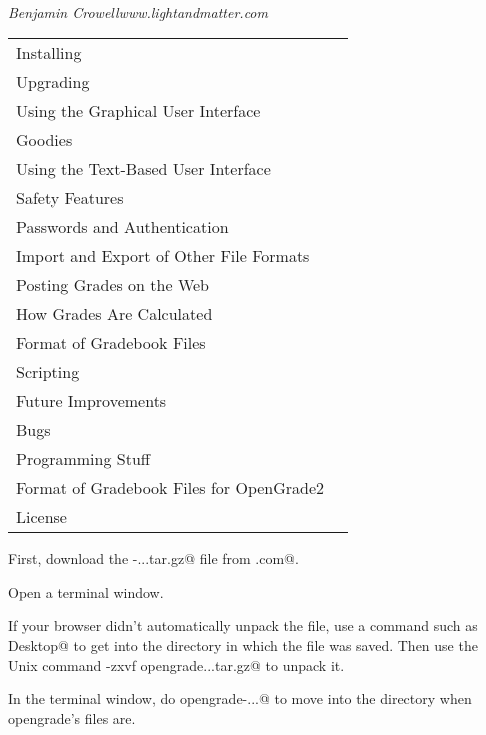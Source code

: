 \documentclass{opengrade_doc}
\begin{document}
\parafmt
{} \\
\emph{Benjamin Crowell}\hfill{}\emph{www.lightandmatter.com}

\vspace{8mm}


\noindent\large\begin{tabular}{ll}
\hline
Installing	& \pageref{installing} \\
Upgrading       & \pageref{upgrading} \\
Using the Graphical User Interface & \pageref{gui} \\
Goodies & \pageref{goodies} \\
Using the Text-Based User Interface & \pageref{textui} \\
Safety Features & \pageref{safety}\\
Passwords and Authentication & \pageref{authentication}\\
Import and Export of Other File Formats & \pageref{import-export} \\
Posting Grades on the Web & \pageref{web} \\
How Grades Are Calculated & \pageref{howcalc} \\
Format of Gradebook Files & \pageref{format} \\
Scripting & \pageref{scripting} \\
Future Improvements & \pageref{improve} \\
Bugs & \pageref{bugs} \\
Programming Stuff & \pageref{programming} \\
Format of Gradebook Files for OpenGrade2 & \pageref{old-format} \\
License	& \pageref{license} \\
\hline
\end{tabular}\normalsize


\label{installing}

First, download the \verb@opengrade-...tar.gz@ file from \verb@lightandmatter.com@.

Open a terminal window.

If your browser didn't automatically unpack the file,
use a command such as \verb@cd Desktop@ to get into the directory in which the file was saved.
Then use the Unix command \verb@tar -zxvf opengrade...tar.gz@ to unpack it.

In the terminal window, do \verb@cd opengrade-...@ to move into the directory when opengrade's files are.
\end{document}
